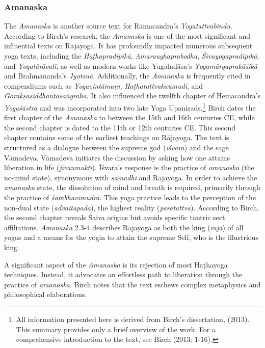\subsubsection{Amanaska}
\label{amanaska}

The \emph{Amanaska} is another source text for Rāmacandra's \emph{Yogatattvabindu}. According to Birch's research, the \emph{Amanaska} is one of the most significant and influential texts on Rājayoga. It has profoundly impacted numerous subsequent yoga texts, including the \emph{Haṭhapradīpikā}, \emph{Amaraughaprabodha}, \emph{Śivayogapradīpikā}, and \emph{Yogatārāvalī}, as well as modern works like Yugaladāsa's \emph{Yogamārgaprakāśikā} and Brahmānanda's \emph{Jyotsnā}. Additionally, the \emph{Amanaska} is frequently cited in compendiums such as \emph{Yogacintāmaṇi}, \emph{Haṭhatattvakaumudī}, and \emph{Gorakṣasiddhāntasaṅgraha}. It also influenced the twelfth chapter of Hemacandra's \emph{Yogaśāstra} and was incorporated into two late Yoga Upaniṣads.\footnote{All information presented here is derived from Birch's dissertation,  (2013). This summary provides only a brief overview of the work. For a comprehensive introduction to the text, see Birch (2013: 1-16).}
Birch dates the first chapter of the \emph{Amanaska} to between the 15th and 16th centuries CE, while the second chapter is dated to the 11th or 12th centuries CE. This second chapter contains some of the earliest teachings on Rājayoga.
The text is structured as a dialogue between the supreme god (\textit{īśvara}) and the sage Vāmadeva. Vāmadeva initiates the discussion by asking how one attains liberation in life (\textit{jīvanmukti}). Īśvara's response is the practice of \textit{amanaska} (the no-mind state), synonymous with \textit{samādhi} and Rājayoga. In order to achieve the \textit{amanaska} state, the dissolution of mind and breath is required, primarily through the practice of \emph{śāmbhavīmudrā}. This yoga practice leads to the perception of the non-dual state (\textit{advaitapada}), the highest reality (\textit{paratattva}). According to Birch, the second chapter reveals Śaiva origins but avoids specific tantric sect affiliations. \emph{Amanaska} 2.3-4 describes Rājayoga as both the king (\textit{rāja}) of all yogas and a means for the yogin to attain the supreme Self, who is the illustrious king.

A significant aspect of the \emph{Amanaska} is its rejection of most Haṭhayoga techniques. Instead, it advocates an effortless path to liberation through the practice of \textit{amanaska}. Birch notes that the text eschews complex metaphysics and philosophical elaborations.

